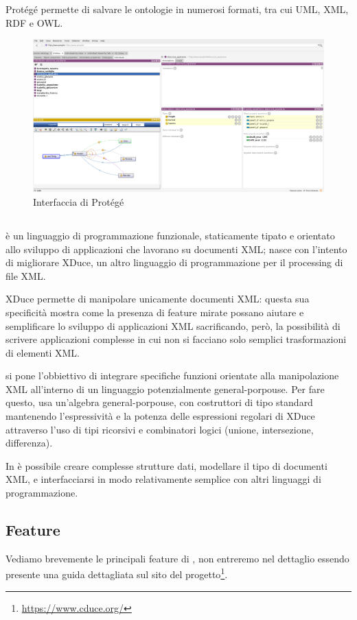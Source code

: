 Protégé permette di salvare le ontologie in numerosi formati, tra cui UML, XML, RDF e OWL.
\begin{figure}[h]
	\centering
	\includegraphics[width=\textwidth]{Picture/interface_protege.png}
	\caption{Interfaccia di Protégé}
\end{figure}
\subsection{\cduce}\label{cduce_intro}
\cduce è un linguaggio di programmazione funzionale, staticamente tipato e orientato allo sviluppo di applicazioni che lavorano su documenti XML\cite{cduceLanguage}; nasce con l'intento di migliorare XDuce, un altro linguaggio di programmazione per il processing di file XML\cite{hosoya2003xduce}. 

XDuce permette di manipolare unicamente documenti XML: questa sua specificità mostra come la presenza di feature mirate possano aiutare e semplificare lo sviluppo di applicazioni XML sacrificando, però, la possibilità di scrivere applicazioni complesse in cui non si facciano solo semplici trasformazioni di elementi XML.

\cduce si pone l'obbiettivo di integrare specifiche funzioni orientate alla manipolazione XML all'interno di un linguaggio potenzialmente general-porpouse. Per fare questo, \cduce usa un'algebra general-porpouse, con costruttori di tipo standard mantenendo l'espressività e la potenza delle espressioni regolari di XDuce attraverso l'uso di tipi ricorsivi e combinatori logici (unione, intersezione, differenza).

In \cduce è possibile creare complesse strutture dati, modellare il tipo di documenti XML, e interfacciarsi in modo relativamente semplice con altri linguaggi di programmazione\cite{cduceLanguage}.
\subsection{Feature}\label{fature_cduce}
Vediamo brevemente le principali feature di \cduce, non entreremo nel dettaglio essendo presente una guida dettagliata sul sito del progetto\footnote{\url{https://www.cduce.org/}}.
